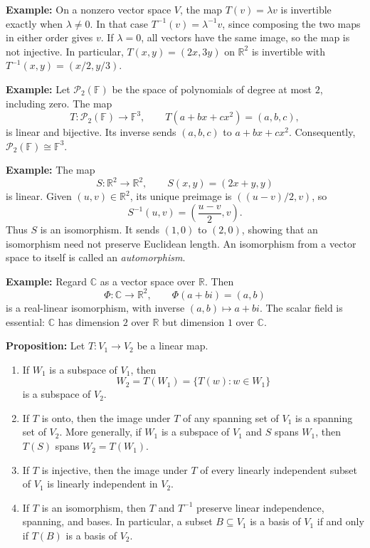 \documentclass[a4paper,11pt,abstract=true]{scrartcl}
\theoremstyle{dotlessP}
\theoremstyle{dotlessS}
\theoremstyle{remark}
\theoremstyle{definition}
\begin{document}
\begin{example_box}
\textbf{Example:} On a nonzero vector
space $V$, the map $T(v)=\lambda v$ is invertible exactly when
$\lambda\neq0$. In that case $T^{-1}(v)=\lambda^{-1}v$, since composing
the two maps in either order gives $v$. If $\lambda=0$, all vectors
have the same image, so the map is not injective. In particular,
$T(x,y)=(2x,3y)$ on $\mathbb{R}^2$ is invertible with
$T^{-1}(x,y)=(x/2,y/3)$.
\end{example_box}

\begin{example_box}
\textbf{Example:} Let
$\mathcal{P}_2(\mathbb{F})$ be the space of polynomials of degree at most
$2$, including zero. The map
\[
T:\mathcal{P}_2(\mathbb{F})\longrightarrow\mathbb{F}^3,
\qquad T(a+bx+cx^2)=(a,b,c),
\]
is linear and bijective. Its inverse sends $(a,b,c)$ to $a+bx+cx^2$.
Consequently, $\mathcal{P}_2(\mathbb{F})\cong\mathbb{F}^3$.
\end{example_box}

\begin{example_box}
\textbf{Example:} The map
\[
S:\mathbb{R}^2\longrightarrow\mathbb{R}^2,
\qquad S(x,y)=(2x+y,y)
\]
is linear. Given $(u,v)\in\mathbb{R}^2$, its unique preimage is
$((u-v)/2,v)$, so
\[
S^{-1}(u,v)=\left(\frac{u-v}{2},v\right).
\]
Thus $S$ is an isomorphism. It sends $(1,0)$ to $(2,0)$, showing that an
isomorphism need not preserve Euclidean length. An isomorphism from a
vector space to itself is called an \emph{automorphism}.
\end{example_box}

\begin{example_box}
\textbf{Example:} Regard
$\mathbb{C}$ as a vector space over $\mathbb{R}$. Then
\[
\Phi:\mathbb{C}\longrightarrow\mathbb{R}^2,
\qquad \Phi(a+bi)=(a,b)
\]
is a real-linear isomorphism, with inverse $(a,b)\mapsto a+bi$.
The scalar field is essential: $\mathbb{C}$ has dimension $2$ over
$\mathbb{R}$ but dimension $1$ over $\mathbb{C}$.
\end{example_box}

\begin{problem_box}
\textbf{Proposition:}
Let $T:V_1\longrightarrow V_2$ be a linear map.
\begin{enumerate}
    \item If $W_1$ is a subspace of $V_1$, then
    \[
    W_2=T(W_1)=\{T(w):w\in W_1\}
    \]
    is a subspace of $V_2$.
    \item If $T$ is onto, then the image under $T$ of any spanning set
    of $V_1$ is a spanning set of $V_2$. More generally, if $W_1$ is a
    subspace of $V_1$ and $S$ spans $W_1$, then $T(S)$ spans
    $W_2=T(W_1)$.
    \item If $T$ is injective, then the image under $T$ of every linearly
    independent subset of $V_1$ is linearly independent in $V_2$.
    \item If $T$ is an isomorphism, then $T$ and $T^{-1}$ preserve
    linear independence, spanning, and bases. In particular, a subset
    $B\subseteq V_1$ is a basis of $V_1$ if and only if $T(B)$ is a
    basis of $V_2$.
\end{enumerate}
\end{problem_box}
\end{document}
